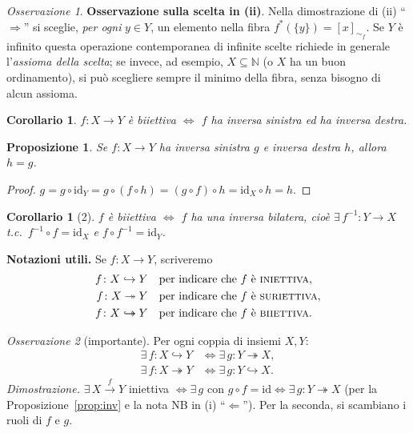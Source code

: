 \documentclass[11pt,a4paper]{article}
\newcommand{\N}{\mathbb{N}}
\newcommand{\id}{\mathrm{id}}
\newcommand{\inv}{^{-1}}
\newcommand{\inj}{\hookrightarrow}
\newcommand{\sur}{\twoheadrightarrow}
\newcommand{\bij}{\mathrel{\hookrightarrow\!\!\!\!\!\!\twoheadrightarrow}}
\theoremstyle{definition}
\theoremstyle{plain}
\newtheorem{proposizione}[definizione]{Proposizione}
\newtheorem{corollario}[definizione]{Corollario}
\theoremstyle{remark}
\newtheorem*{osservazione}{Osservazione}
\begin{document}
\begin{osservazione}
\textbf{Osservazione sulla scelta in (ii)}. 
Nella dimostrazione di (ii) ``$\Rightarrow$'' si sceglie, \emph{per ogni} $y\in Y$, un elemento nella fibra $f^*(\{y\})=[x]_{\sim_f}$. Se $Y$ \`e infinito questa operazione contemporanea di infinite scelte richiede in generale l'\emph{assioma della scelta}; se invece, ad esempio, $X\subseteq\N$ (o $X$ ha un buon ordinamento), si pu\`o scegliere sempre il minimo della fibra, senza bisogno di alcun assioma.
\end{osservazione}

\begin{corollario}
$f\colon X\to Y$ \`e biiettiva $\iff$ $f$ ha inversa sinistra ed ha inversa destra.
\end{corollario}

\begin{proposizione}
Se $f\colon X\to Y$ ha inversa sinistra $g$ e inversa destra $h$, allora $h=g$.
\end{proposizione}
\begin{proof}
$g=g\circ\id_Y=g\circ(f\circ h)=(g\circ f)\circ h=\id_X\circ h=h$.
\end{proof}

\begin{corollario}[2]
$f$ \`e biiettiva $\iff$ $f$ ha una inversa bilatera, cio\`e $\exists\,f\inv\colon Y\to X$ t.c.\ $f\inv\circ f=\id_X$ e $f\circ f\inv=\id_Y$.
\end{corollario}

\textbf{Notazioni utili.} Se $f\colon X\to Y$, scriveremo
\begin{align*}
f\colon X\inj Y&\quad\text{per indicare che $f$ \`e \textsc{iniettiva}},\\
f\colon X\sur Y&\quad\text{per indicare che $f$ \`e \textsc{suriettiva}},\\
f\colon X\bij Y&\quad\text{per indicare che $f$ \`e \textsc{biiettiva}}.
\end{align*}

\begin{osservazione}[importante]
Per ogni coppia di insiemi $X,Y$:
\begin{align*}
\exists\,f\colon X\inj Y&\iff\exists\,g\colon Y\sur X,\\
\exists\,f\colon X\sur Y&\iff\exists\,g\colon Y\inj X.
\end{align*}
\emph{Dimostrazione.} $\exists\,X\xrightarrow{f}Y$ iniettiva $\iff\exists\,g$ con $g\circ f=\id\iff\exists\,g\colon Y\sur X$ (per la Proposizione~\ref{prop:inv} e la nota \textsc{NB} in (i) ``$\Leftarrow$''). Per la seconda, si scambiano i ruoli di $f$ e $g$.
\end{osservazione}
\end{document}
